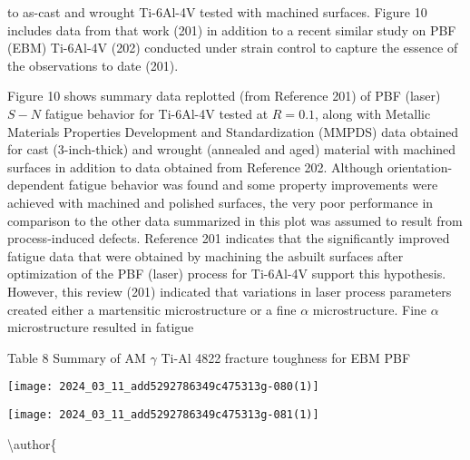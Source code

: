 \documentclass[10pt]{article}
\begin{document}
to as-cast and wrought Ti-6Al-4V tested with machined surfaces. Figure 10 includes data from that work (201) in addition to a recent similar study on PBF (EBM) Ti-6Al-4V (202) conducted under strain control to capture the essence of the observations to date (201).

Figure 10 shows summary data replotted (from Reference 201) of PBF (laser) $S-N$ fatigue behavior for Ti-6Al-4V tested at $R=0.1$, along with Metallic Materials Properties Development and Standardization (MMPDS) data obtained for cast (3-inch-thick) and wrought (annealed and aged) material with machined surfaces in addition to data obtained from Reference 202. Although orientation-dependent fatigue behavior was found and some property improvements were achieved with machined and polished surfaces, the very poor performance in comparison to the other data summarized in this plot was assumed to result from process-induced defects. Reference 201 indicates that the significantly improved fatigue data that were obtained by machining the asbuilt surfaces after optimization of the PBF (laser) process for Ti-6Al-4V support this hypothesis. However, this review (201) indicated that variations in laser process parameters created either a martensitic microstructure or a fine $\alpha$ microstructure. Fine $\alpha$ microstructure resulted in fatigue

Table 8 Summary of AM $\gamma$ Ti-Al 4822 fracture toughness for EBM PBF

\begin{center}
\texttt{[image: 2024\_03\_11\_add5292786349c475313g-080(1)]}
\end{center}

\begin{center}
\texttt{[image: 2024\_03\_11\_add5292786349c475313g-081(1)]}
\end{center}

\textbackslash author\{
\end{document}
